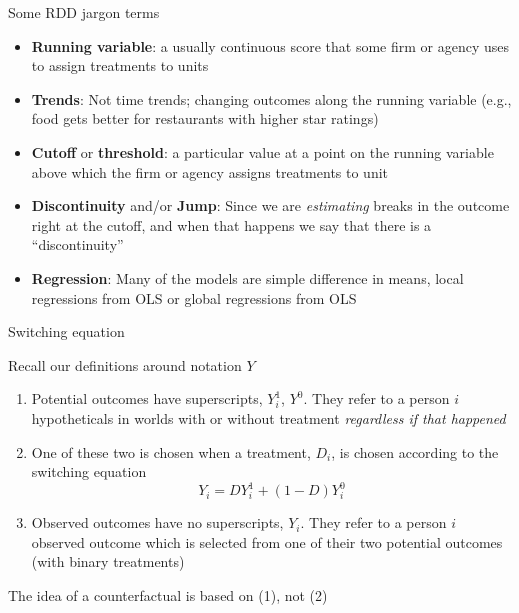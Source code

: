 \documentclass{beamer}
\begin{document}
\begin{frame}{Some RDD jargon terms}

\begin{itemize}
\item \textbf{Running variable}: a usually continuous score that some firm or agency uses to assign treatments to units
\item \textbf{Trends}: Not time trends; changing outcomes along the running variable (e.g., food gets better for restaurants with higher star ratings)
\item \textbf{Cutoff} or \textbf{threshold}: a particular value at a point on the running variable above which the firm or agency assigns treatments to unit
\item \textbf{Discontinuity} and/or \textbf{Jump}: Since we are \emph{estimating} breaks in the outcome right at the cutoff, and when that happens we say that there is a ``discontinuity''
\item \textbf{Regression}: Many of the models are simple difference in means, local regressions from OLS or global regressions from OLS
\end{itemize}

\end{frame}




	
\begin{frame}{Switching equation}

Recall our definitions around notation $Y$

\begin{enumerate}
\item Potential outcomes have superscripts, $Y^1_i$, $Y^0$. They refer to a person $i$ hypotheticals in worlds with or without treatment \emph{regardless if that happened}
\item One of these two is chosen when a treatment, $D_i$, is chosen according to the switching equation $$Y_i = DY^1_i + (1-D)Y^0_i$$
\item Observed outcomes have no superscripts, $Y_i$. They refer to a person $i$ observed outcome which is selected from one of their two potential outcomes (with binary treatments)
\end{enumerate}
\bigskip
The idea of a counterfactual is based on (1), not (2)

\end{frame}
\end{document}
